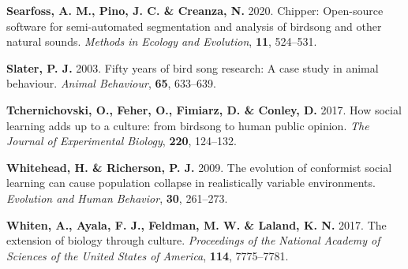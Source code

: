 \documentclass[]{report}
\begin{document}
\leavevmode\hypertarget{ref-Searfoss2020}{}%
\textbf{Searfoss, A. M., Pino, J. C. \& Creanza, N.} 2020. Chipper:
Open-source software for semi-automated segmentation and analysis of
birdsong and other natural sounds. \emph{Methods in Ecology and
Evolution}, \textbf{11}, 524--531.

\leavevmode\hypertarget{ref-Slater2003}{}%
\textbf{Slater, P. J.} 2003. Fifty years of bird song research: A case
study in animal behaviour. \emph{Animal Behaviour}, \textbf{65},
633--639.

\leavevmode\hypertarget{ref-Tchernichovski2017a}{}%
\textbf{Tchernichovski, O., Feher, O., Fimiarz, D. \& Conley, D.} 2017.
How social learning adds up to a culture: from birdsong to human public
opinion. \emph{The Journal of Experimental Biology}, \textbf{220},
124--132.

\leavevmode\hypertarget{ref-Whitehead2009}{}%
\textbf{Whitehead, H. \& Richerson, P. J.} 2009. The evolution of
conformist social learning can cause population collapse in
realistically variable environments. \emph{Evolution and Human
Behavior}, \textbf{30}, 261--273.

\leavevmode\hypertarget{ref-Whiten2017}{}%
\textbf{Whiten, A., Ayala, F. J., Feldman, M. W. \& Laland, K. N.} 2017.
The extension of biology through culture. \emph{Proceedings of the
National Academy of Sciences of the United States of America},
\textbf{114}, 7775--7781.
\end{document}
